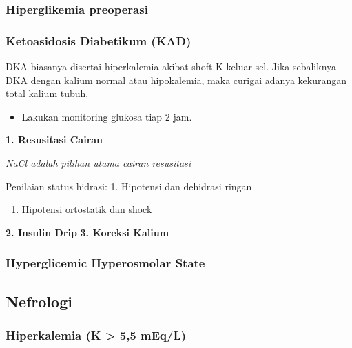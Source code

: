 \documentclass[
]{book}
\providecommand{\tightlist}{%
  \setlength{\itemsep}{0pt}\setlength{\parskip}{0pt}}
\begin{document}
\hypertarget{hiperglikemia-preoperasi}{%
\subsubsection{Hiperglikemia preoperasi}\label{hiperglikemia-preoperasi}}

\hypertarget{ketoasidosis-diabetikum-kad}{%
\subsubsection{Ketoasidosis Diabetikum (KAD)}\label{ketoasidosis-diabetikum-kad}}

DKA biasanya disertai hiperkalemia akibat shoft K keluar sel. Jika sebaliknya DKA dengan kalium normal atau hipokalemia, maka curigai adanya kekurangan total kalium tubuh.

\begin{itemize}
\tightlist
\item
  Lakukan monitoring glukosa tiap 2 jam.
\end{itemize}

\textbf{1. Resusitasi Cairan}

\emph{NaCl adalah pilihan utama cairan resusitasi}

Penilaian status hidrasi:
1. Hipotensi dan dehidrasi ringan

\begin{enumerate}
\def\labelenumi{\arabic{enumi}.}
\setcounter{enumi}{1}
\tightlist
\item
  Hipotensi ortostatik dan shock
\end{enumerate}

\textbf{2. Insulin Drip}
\textbf{3. Koreksi Kalium}

\hypertarget{hyperglicemic-hyperosmolar-state}{%
\subsubsection{Hyperglicemic Hyperosmolar State}\label{hyperglicemic-hyperosmolar-state}}

\hypertarget{nefrologi}{%
\subsection{Nefrologi}\label{nefrologi}}

\hypertarget{hiperkalemia-k-55-meql}{%
\subsubsection{Hiperkalemia (K \textgreater{} 5,5 mEq/L)}\label{hiperkalemia-k-55-meql}}
\end{document}
